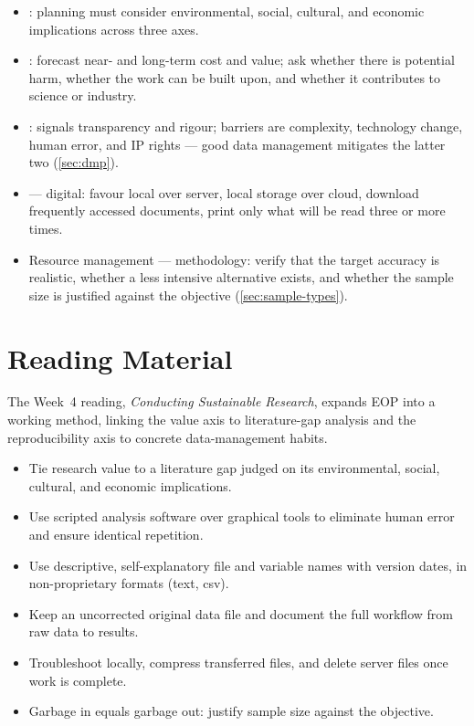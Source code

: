 \documentclass[../main.tex]{subfiles}
\begin{document}
\begin{itemize}
  \item {}: planning must consider environmental, social, cultural, and economic implications across three axes.
  \item {}: forecast near- and long-term cost and value; ask whether there is potential harm, whether the work can be built upon, and whether it contributes to science or industry.
  \item {}: signals transparency and rigour; barriers are complexity, technology change, human error, and IP rights — good data management mitigates the latter two (\autoref{sec:dmp}).
  \item {} — digital: favour local over server, local storage over cloud, download frequently accessed documents, print only what will be read three or more times.
  \item Resource management — methodology: verify that the target accuracy is realistic, whether a less intensive alternative exists, and whether the sample size is justified against the objective (\autoref{sec:sample-types}).
\end{itemize}

\section{Reading Material}
\label{sec:reading4}

\begin{partbox}
The Week~4 reading, \textit{Conducting Sustainable Research}, expands EOP into a working method, linking the value axis to literature-gap analysis and the reproducibility axis to concrete data-management habits.
\end{partbox}

\begin{itemize}
  \item Tie research value to a literature gap judged on its environmental, social, cultural, and economic implications.
  \item Use scripted analysis software over graphical tools to eliminate human error and ensure identical repetition.
  \item Use descriptive, self-explanatory file and variable names with version dates, in non-proprietary formats (text, csv).
  \item Keep an uncorrected original data file and document the full workflow from raw data to results.
  \item Troubleshoot locally, compress transferred files, and delete server files once work is complete.
  \item Garbage in equals garbage out: justify sample size against the objective.
\end{itemize}
\end{document}
